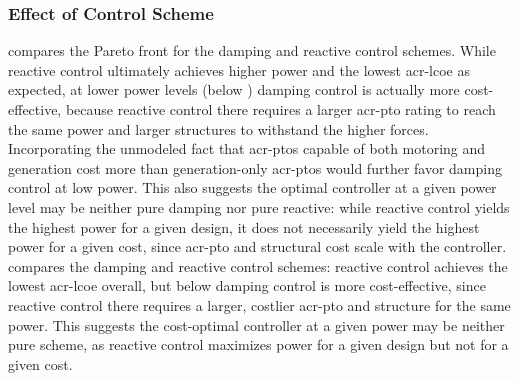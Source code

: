 \subsubsection{Effect of Control Scheme}
\ifdefined\DISSERTATION
     compares the Pareto front for the damping and reactive control schemes.
    While reactive control ultimately achieves higher power and the lowest \gls{acr-lcoe} as expected, at lower power levels (below \resultsRE[dampingReactivePowerIntersect]) damping control is actually more cost-effective, because reactive control there requires a larger \gls{acr-pto} rating to reach the same power and larger structures to withstand the higher forces.
    Incorporating the unmodeled fact that \glspl{acr-pto} capable of both motoring and generation cost more than generation-only \glspl{acr-pto} would further favor damping control at low power.
    This also suggests the optimal controller at a given power level may be neither pure damping nor pure reactive: while reactive control yields the highest power for a given design, it does not necessarily yield the highest power for a given cost, since \gls{acr-pto} and structural cost scale with the controller.
\else
     compares the damping and reactive control schemes: reactive control achieves the lowest \gls{acr-lcoe} overall, but below \resultsRE[dampingReactivePowerIntersect] damping control is more cost-effective, since reactive control there requires a larger, costlier \gls{acr-pto} and structure for the same power.
    This suggests the cost-optimal controller at a given power may be neither pure scheme, as reactive control maximizes power for a given design but not for a given cost.
\fi

